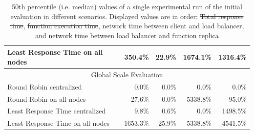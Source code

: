 \documentclass[draft,final]{vutinfth} %
\providecommand{\DIFaddtex}[1]{{\protect\color{blue}\uwave{#1}}} %
\providecommand{\DIFdeltex}[1]{{\protect\color{red}\sout{#1}}}                      %
\providecommand{\DIFaddFL}[1]{\DIFadd{#1}} %
\providecommand{\DIFdelFL}[1]{\DIFdel{#1}} %
\providecommand{\DIFaddbeginFL}{} %
\providecommand{\DIFaddendFL}{} %
\providecommand{\DIFdelbeginFL}{} %
\providecommand{\DIFdelendFL}{} %
\providecommand{\DIFadd}[1]{\texorpdfstring{\DIFaddtex{#1}}{#1}} %
\providecommand{\DIFdel}[1]{\texorpdfstring{\DIFdeltex{#1}}{}} %
\begin{document}
\begin{table}[]
\begin{tabular}{lrrrr}
Least Response Time on all nodes & 350.4\%                          & 22.9\%                           & 1674.1\%                               & 1316.4\%                               \\ \hline
\multicolumn{5}{c}{Global Scale Evaluation}                                                                                                                                              \\ \hline
Round Robin centralized          & 0.0\%                            & 0.0\%                            & 0.0\%                                  & 0.0\%                                  \\
Round Robin on all nodes         & 27.6\%                           & 0.0\%                            & 5338.8\%                               & 95.0\%                                 \\
Least Response Time centralized  & 9.8\%                            & 0.6\%                            & 0.0\%                                  & 1498.5\%                               \\
Least Response Time on all nodes & 1653.3\%                         & 25.9\%                           & 5338.8\%                               & 4541.5\%                               \\ \hline
\end{tabular}
\caption{50th percentile (i.e. median) values of a single experimental run of the initial evaluation in different scenarios. Displayed values are in order: \DIFdelbeginFL \DIFdelFL{Total response time}\DIFdelendFL \DIFaddbeginFL \DIFaddFL{\mbox{%
\gls{trt}}\hskip0pt%
}\DIFaddendFL , \DIFdelbeginFL \DIFdelFL{function execution time}\DIFdelendFL \DIFaddbeginFL \DIFaddFL{\mbox{%
\gls{fet}}\hskip0pt%
}\DIFaddendFL , network time between client and load balancer, and network time between load balancer and function replica}
\label{tab:initial_eval_results_q50}
\end{table}
\end{document}
